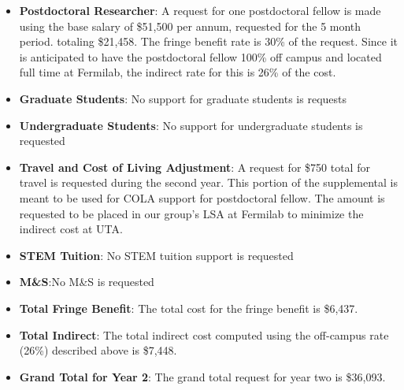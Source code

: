 \begin{enumerate}
\begin{itemize}[noitemsep,nolistsep]
\item {{\bf Postdoctoral Researcher}: A request for one postdoctoral fellow is made using the base salary of \$51,500 per annum, requested for the 5 month period. totaling \$21,458.  The fringe benefit rate is 30\% of the request. Since it is anticipated to have the postdoctoral fellow 100\% off campus and located full time at Fermilab, the indirect rate for this is 26\% of the cost.} 


\item{{\bf Graduate Students}: No support for graduate students is requests}

\item {{\bf Undergraduate Students}: No support for undergraduate students is requested}

\item{{\bf Travel and Cost of Living Adjustment}: A request for \$750 total for travel is requested during the second year.  This portion of the supplemental is meant to be used for COLA support for postdoctoral fellow. The amount is requested to be placed in our group’s LSA at Fermilab to minimize the indirect cost at UTA.}

\item {{\bf STEM Tuition}: No STEM tuition support is requested}

\item {{\bf M\&S}:No M\&S is requested}

\item {{\bf Total Fringe Benefit}: The total cost for the fringe benefit is \$6,437.}

\item {{\bf Total Indirect}: The total indirect cost computed using the off-campus rate (26\%) described above is \$7,448.}

\item {{\bf Grand Total for Year 2}: The grand total request for year two is \$36,093.}

\end{itemize}

\end{enumerate}
